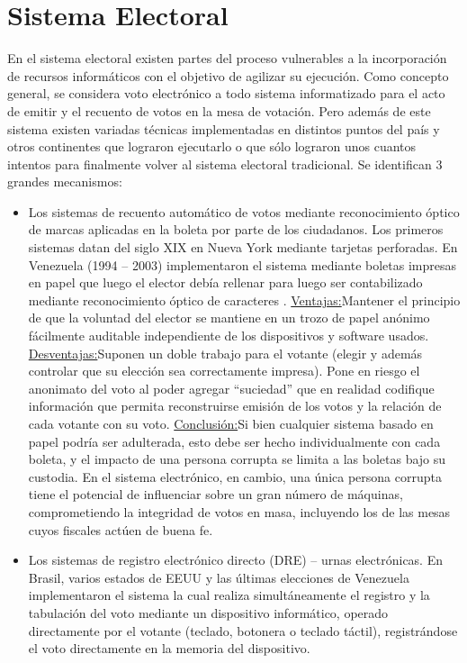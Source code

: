 \label{SistemaElectoral}
\chapter{Sistema Electoral}
En el sistema electoral existen partes del proceso vulnerables a la incorporación de recursos informáticos con el objetivo de agilizar su ejecución. Como concepto general, se considera voto electrónico a todo sistema informatizado para el acto de emitir y el recuento de votos en la mesa de votación. Pero además de este sistema existen variadas técnicas implementadas en distintos puntos del país y otros continentes que lograron ejecutarlo o que sólo lograron unos cuantos intentos para finalmente volver al sistema electoral tradicional.\newline
Se identifican 3 grandes mecanismos:
\begin{itemize}
    \item Los sistemas de recuento automático de votos mediante reconocimiento óptico de marcas aplicadas en la boleta por parte de los ciudadanos.	Los primeros sistemas datan del siglo XIX en Nueva York mediante tarjetas perforadas. En Venezuela (1994 – 2003) implementaron el sistema mediante boletas impresas en papel que luego el elector debía rellenar para luego ser contabilizado mediante reconocimiento óptico de caracteres \cite{eleccionesVenezuela}.\newline
    \underline{Ventajas:}Mantener el principio de que la voluntad del elector se mantiene en un trozo de papel anónimo fácilmente auditable independiente de los dispositivos y software usados.\newline
    \underline{Desventajas:}Suponen un doble trabajo para el votante (elegir y además controlar que su elección sea correctamente impresa). Pone en riesgo el anonimato del voto al poder agregar “suciedad” que en realidad codifique información que permita reconstruirse emisión de los votos y la relación de cada votante con su voto.\newline
    \underline{Conclusión:}Si bien cualquier sistema basado en papel podría ser adulterada, esto debe ser hecho individualmente con cada boleta, y el impacto de una persona corrupta se limita a las boletas bajo su custodia. En el sistema electrónico, en cambio, una única persona corrupta tiene el potencial de influenciar sobre un gran número de máquinas, comprometiendo la integridad de votos en masa, incluyendo los de las mesas cuyos fiscales actúen de buena fe.
    \item Los sistemas de registro electrónico directo (DRE) – urnas electrónicas. En Brasil, varios estados de EEUU y las últimas elecciones de Venezuela implementaron el sistema la cual realiza simultáneamente el registro y la tabulación del voto mediante un dispositivo informático, operado directamente por el votante (teclado, botonera o teclado táctil), registrándose el voto directamente en la memoria del dispositivo.\newline

\end{itemize}
